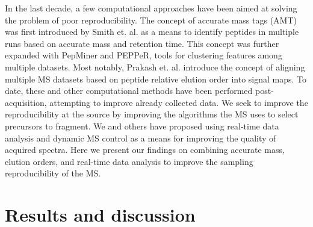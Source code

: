 In the last decade, a few computational approaches have been aimed at solving the problem of poor reproducibility. The concept of accurate mass tags (AMT) was first introduced by Smith et. al. as a means to identify peptides in multiple runs based on accurate mass and retention time.\cite{smith} This concept was further expanded with PepMiner and PEPPeR, tools for clustering features among multiple datasets.\cite{pepminer,pepper} Most notably, Prakash et. al. introduce the concept of aligning multiple MS datasets based on peptide relative elution order into signal maps.\cite{prakash} To date, these and other computational methods\cite{radulovic,listgarten,shen,zhang,lin,bateman} have been performed post-acquisition, attempting to improve already collected data. We seek to improve the reproducibility at the source by improving the algorithms the MS uses to select precursors to fragment. We and others have proposed using real-time data analysis and dynamic MS control as a means for improving the quality of acquired spectra.\cite{inseq,graumann,webber} Here we present our findings on combining accurate mass, elution orders, and real-time data analysis to improve the sampling reproducibility of the MS.

\section{Results and discussion}

